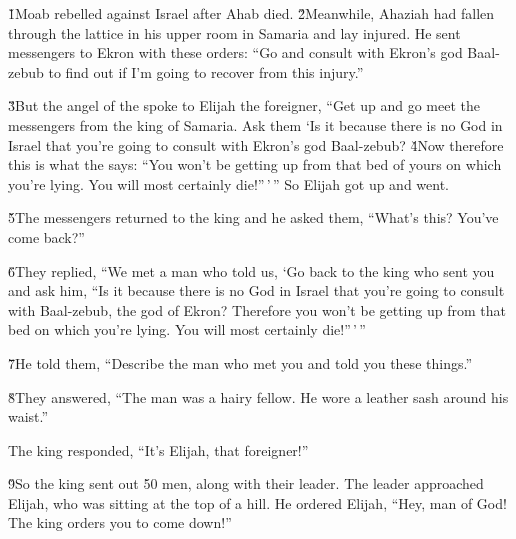 


\v{1}Moab rebelled against Israel after Ahab died. \v{2}Meanwhile, Ahaziah had fallen through the lattice in his upper room in Samaria and lay injured. He sent messengers to Ekron with these orders: ``Go and consult with Ekron's god Baal-zebub to find out if I'm going to recover from this injury.''

\v{3}But the angel of the  spoke to Elijah the foreigner, ``Get up and go meet the messengers from the king of Samaria. Ask them `Is it because there is no God in Israel that you're going to consult with Ekron's god Baal-zebub? \v{4}Now therefore this is what the  says: ``You won't be getting up from that bed of yours on which you're lying. You will most certainly die!''\,'\,'' So Elijah got up and went.

\v{5}The messengers returned to the king and he asked them, ``What's this? You've come back?''

\v{6}They replied, ``We met a man who told us, `Go back to the king who sent you and ask him, ``Is it because there is no God in Israel that you're going to consult with Baal-zebub, the god of Ekron? Therefore you won't be getting up from that bed on which you're lying. You will most certainly die!''\,'\,''

\v{7}He told them, ``Describe the man who met you and told you these things.''

\v{8}They answered, ``The man was a hairy fellow. He wore a leather sash around his waist.''

The king responded, ``It's Elijah, that foreigner!''

\v{9}So the king sent out 50 men, along with their leader. The leader approached Elijah, who was sitting at the top of a hill. He ordered Elijah, ``Hey, man of God! The king orders you to come down!''

